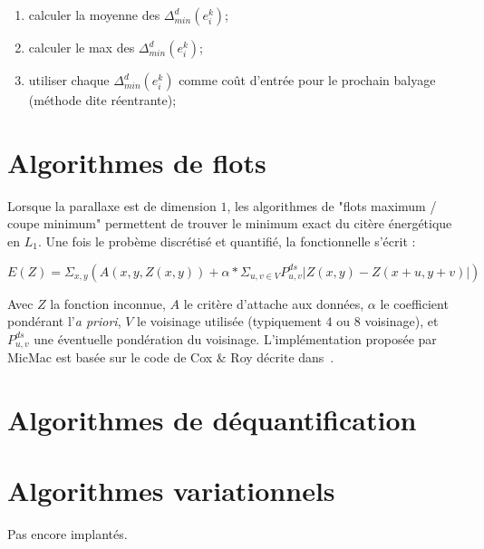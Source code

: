 \begin{enumerate}
   \item calculer la moyenne des $\Delta^d_{min}(e^k_i)$;
   \item calculer le max des $\Delta^d_{min}(e^k_i)$;
   \item utiliser chaque $\Delta^d_{min}(e^k_i)$ comme co\^ut d'entr\'ee
         pour le prochain balyage (m\'ethode dite r\'eentrante);
\end{enumerate}





\section{Algorithmes de flots}

Lorsque la parallaxe est de dimension $1$,
les algorithmes de "flots maximum / coupe minimum" permettent
de trouver le minimum exact du cit\`ere \'energ\'etique
en $L_1$. Une fois le prob\`eme discr\'etis\'e et quantifi\'e,
la fonctionnelle s'\'ecrit :


\begin{equation}
  \label{CostGrad:MaxFlot}
  E(Z) = \Sigma _{x,y}  (A(x,y,Z(x,y)) + \alpha *  \Sigma _{u,v \in V}P^{ds}_{u,v}|Z(x,y)-Z(x+u,y+v)|)
\end{equation}

Avec $Z$ la fonction inconnue, $A$ le crit\`ere d'attache aux donn\'ees,
$\alpha$ le coefficient pond\'erant l'\emph{a priori}, $V$ le voisinage
utilis\'ee (typiquement $4$ ou $8$ voisinage), et $P^{ds}_{u,v}$ une
\'eventuelle pond\'eration du voisinage.
L'impl\'ementation propos\'ee par MicMac est bas\'ee sur le code
de Cox \& Roy d\'ecrite dans~\cite{CoxRoy}.





\section{Algorithmes de d\'equantification}

\label{DUMG:DEQUANTIF}



\section{Algorithmes variationnels}

Pas encore implant\'es.



